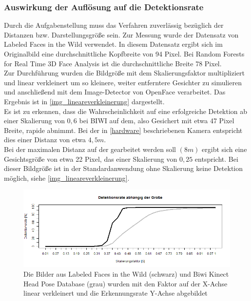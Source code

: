 \subsubsection{Auswirkung der Auflösung auf die Detektionsrate}
Durch die Aufgabenstellung muss das Verfahren zuverlässig bezüglich der Distanzen bzw. Darstellungsgröße sein. Zur Messung wurde der Datensatz von Labeled Faces in the Wild \cite{database_Face} verwendet. In diesem Datensatz ergibt sich im Originalbild eine durchschnittliche Kopfbreite von 94 Pixel. Bei Random Forests for Real Time 3D Face Analysis \cite{database_Face_Ori} ist die durchschnittliche Breite 78 Pixel.\\
Zur Durchführung wurden die Bildgröße mit dem Skalierungsfaktor multipliziert und linear verkleinert um so kleinere, weiter entferntere Gesichter zu simulieren und anschließend mit dem Image-Detector von OpenFace verarbeitet. Das Ergebnis ist in \autoref{img_lineareverkleinerung} dargestellt.\\
Es ist zu erkennen, dass die Wahrscheinlichkeit auf eine erfolgreiche Detektion ab einer Skalierung von $0,6$ bei BIWI auf dem, also Gesichert mit etwa 47 Pixel Breite, rapide abnimmt. Bei der in \autoref{hardware} beschriebenen Kamera entspricht dies einer Distanz von etwa $4,5m$.\\
Bei der maximalen Distanz auf der gearbeitet werden soll $(8m)$ ergibt sich eine Gesichtsgröße von etwa 22 Pixel, das einer Skalierung von $0,25$ entspricht. Bei dieser Bildgröße ist in der Standardanwendung ohne Skalierung keine Detektion möglich, siehe \autoref{img_lineareverkleinerung}.
\begin{figure}
	\centering
	\includegraphics[width=\linewidth]{img_Skalierung/Gesicht_Rate}
	\caption{Die Bilder aus Labeled Faces in the Wild \cite{database_Face} (schwarz) und Biwi Kinect Head Pose Database \cite{BIWI_database} (grau) wurden mit den Faktor auf der X-Achse linear verkleinert und die Erkennungsrate Y-Achse abgebildet}
	\label{img_lineareverkleinerung}
\end{figure}
